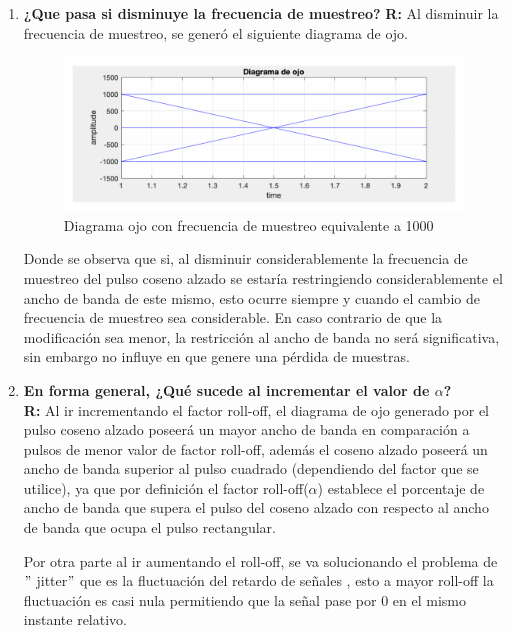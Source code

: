 \begin{enumerate}
    \item \textbf{¿Que pasa si disminuye la frecuencia de muestreo?}
    \textbf{R:}
    Al disminuir la frecuencia de muestreo, se generó el siguiente diagrama de ojo.
    
    \begin{figure}[H]
    \centering
    \includegraphics[scale=0.18]{Imagenes/DiagramaOjo/do.pdf}
    \caption{Diagrama ojo con frecuencia de muestreo equivalente a 1000}
    \label{fig:Diagrama ojo con frecuencia de muestreo baja}
\end{figure}

Donde se observa que si, al disminuir considerablemente la frecuencia de muestreo del pulso coseno alzado se estaría restringiendo considerablemente el ancho de banda de este mismo, esto ocurre siempre y cuando el cambio de frecuencia de muestreo sea considerable. En caso contrario de que la modificación sea menor, la restricción al ancho de banda no será significativa, sin embargo no influye en que genere una pérdida de muestras.

    \item \textbf{En forma general, ¿Qué sucede al incrementar el valor de $\alpha$?}\\
    \textbf{R:}    Al ir incrementando el factor roll-off, el diagrama de ojo generado por el pulso coseno alzado poseerá un mayor ancho de banda en comparación a pulsos de menor valor de factor roll-off, además el coseno alzado poseerá un ancho de banda superior al pulso cuadrado  (dependiendo del factor que se utilice), ya que por definición el factor roll-off($\alpha$) establece  el porcentaje de ancho de banda que supera  el pulso del coseno alzado con respecto al ancho de banda que ocupa el pulso rectangular.\cite{WinNT:filtro}
   
    
    Por otra parte al ir aumentando el roll-off, se va solucionando el problema de $"$ jitter$"$ que es la fluctuación del retardo de señales \cite{WinNT:jitter}, esto a mayor roll-off la fluctuación es casi nula permitiendo que la señal pase por 0 en el mismo instante relativo.
    


\end{enumerate}